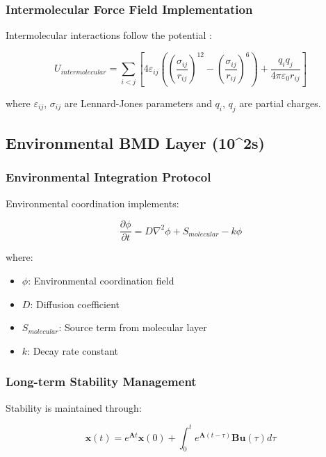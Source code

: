 \subsubsection{Intermolecular Force Field Implementation}

Intermolecular interactions follow the potential \cite{stone2013theory}:

\begin{equation}
U_{intermolecular} = \sum_{i<j} \left[ 4\varepsilon_{ij} \left( \left(\frac{\sigma_{ij}}{r_{ij}}\right)^{12} - \left(\frac{\sigma_{ij}}{r_{ij}}\right)^6 \right) + \frac{q_i q_j}{4\pi\varepsilon_0 r_{ij}} \right]
\end{equation}

where $\varepsilon_{ij}$, $\sigma_{ij}$ are Lennard-Jones parameters and $q_i$, $q_j$ are partial charges.

\subsection{Environmental BMD Layer (10^2s)}

\subsubsection{Environmental Integration Protocol}

Environmental coordination implements:

\begin{equation}
\frac{\partial \phi}{\partial t} = D \nabla^2 \phi + S_{molecular} - k \phi
\end{equation}

where:
\begin{itemize}
\item $\phi$: Environmental coordination field
\item $D$: Diffusion coefficient  
\item $S_{molecular}$: Source term from molecular layer
\item $k$: Decay rate constant
\end{itemize}

\subsubsection{Long-term Stability Management}

Stability is maintained through:

\begin{equation}
\mathbf{x}(t) = e^{\mathbf{A}t} \mathbf{x}(0) + \int_0^t e^{\mathbf{A}(t-\tau)} \mathbf{B} \mathbf{u}(\tau) d\tau
\end{equation}

